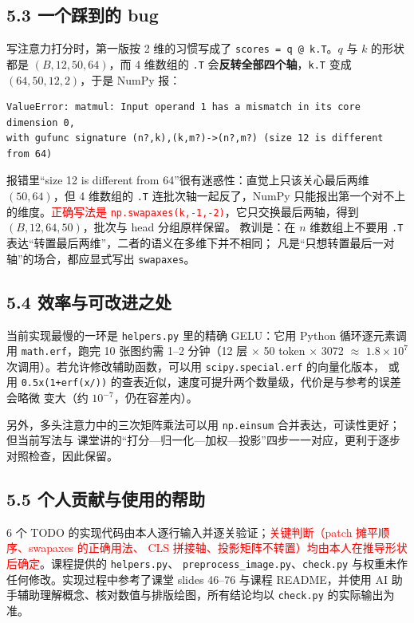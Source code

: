 \documentclass[a4paper,12pt]{article}
\newcommand{\mine}[1]{\textcolor{red}{#1}}
\begin{document}
\subsection*{5.3 一个踩到的 bug}
\label{sec:bug}

写注意力打分时，第一版按 2 维的习惯写成了 \texttt{scores = q @ k.T}。$q$ 与 $k$ 的形状都是
$(B,12,50,64)$，而 4 维数组的 \texttt{.T} 会\textbf{反转全部四个轴}，\texttt{k.T} 变成
$(64,50,12,2)$，于是 NumPy 报：

\begin{verbatim}
ValueError: matmul: Input operand 1 has a mismatch in its core dimension 0,
with gufunc signature (n?,k),(k,m?)->(n?,m?) (size 12 is different from 64)
\end{verbatim}

报错里“size 12 is different from 64”很有迷惑性：直觉上只该关心最后两维 $(50,64)$，但 4 维数组的
\texttt{.T} 连批次轴一起反了，NumPy 只能报出第一个对不上的维度。\mine{正确写法是
\texttt{np.swapaxes(k,-1,-2)}}，它只交换最后两轴，得到 $(B,12,64,50)$，批次与 head 分组原样保留。
教训是：在 $n$ 维数组上不要用 \texttt{.T} 表达“转置最后两维”，二者的语义在多维下并不相同；
凡是“只想转置最后一对轴”的场合，都应显式写出 \texttt{swapaxes}。

\subsection*{5.4 效率与可改进之处}

当前实现最慢的一环是 \texttt{helpers.py} 里的精确 GELU：它用 Python 循环逐元素调用
\texttt{math.erf}，跑完 10 张图约需 1–2 分钟（12 层 $\times$ 50 token $\times$ 3072 $\approx$
$1.8\times10^{7}$ 次调用）。若允许修改辅助函数，可以用 \texttt{scipy.special.erf} 的向量化版本，
或用 \texttt{0.5x(1+erf(x/))} 的查表近似，速度可提升两个数量级，代价是与参考的误差会略微
变大（约 $10^{-7}$，仍在容差内）。

另外，多头注意力中的三次矩阵乘法可以用 \texttt{np.einsum} 合并表达，可读性更好；但当前写法与
课堂讲的“打分—归一化—加权—投影”四步一一对应，更利于逐步对照检查，因此保留。

\subsection*{5.5 个人贡献与使用的帮助}

6 个 TODO 的实现代码由本人逐行输入并逐关验证；\mine{关键判断（patch 摊平顺序、swapaxes 的正确用法、
CLS 拼接轴、投影矩阵不转置）均由本人在推导形状后确定}。课程提供的 \texttt{helpers.py}、
\texttt{preprocess\_image.py}、\texttt{check.py} 与权重未作任何修改。实现过程中参考了课堂
slides 46--76 与课程 README，并使用 AI 助手辅助理解概念、核对数值与排版绘图，所有结论均以
\texttt{check.py} 的实际输出为准。
\end{document}
